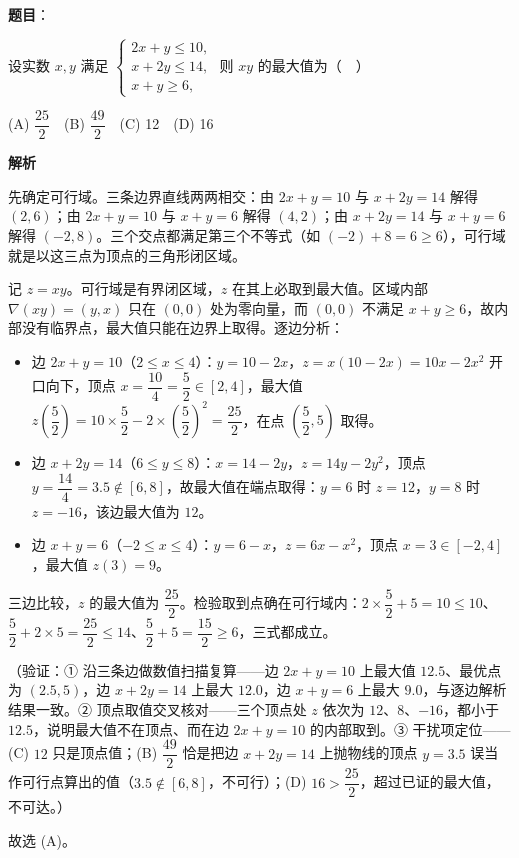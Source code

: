 \begin{answer}

\textbf{题目}：

设实数 \(x,y\) 满足 \(\begin{cases}2x+y\leqslant 10,\\ x+2y\leqslant 14,\\ x+y\geqslant 6,\end{cases}\) 则 \(xy\) 的最大值为（　）

(A) \(\dfrac{25}{2}\)　(B) \(\dfrac{49}{2}\)　(C) 12　(D) 16

\textbf{解析}

先确定可行域。三条边界直线两两相交：由 \(2x+y=10\) 与 \(x+2y=14\) 解得 \((2,6)\)；由 \(2x+y=10\) 与 \(x+y=6\) 解得 \((4,2)\)；由 \(x+2y=14\) 与 \(x+y=6\) 解得 \((-2,8)\)。三个交点都满足第三个不等式（如 \((-2)+8=6\geqslant6\)），可行域就是以这三点为顶点的三角形闭区域。

记 \(z=xy\)。可行域是有界闭区域，\(z\) 在其上必取到最大值。区域内部 \(\nabla(xy)=(y,x)\) 只在 \((0,0)\) 处为零向量，而 \((0,0)\) 不满足 \(x+y\geqslant6\)，故内部没有临界点，最大值只能在边界上取得。逐边分析：

\begin{itemize}
\item 边 \(2x+y=10\)（\(2\leqslant x\leqslant4\)）：\(y=10-2x\)，\(z=x(10-2x)=10x-2x^2\) 开口向下，顶点 \(x=\dfrac{10}{4}=\dfrac52\in[2,4]\)，最大值 \(z\left(\dfrac52\right)=10\times\dfrac52-2\times\left(\dfrac52\right)^2=\dfrac{25}{2}\)，在点 \(\left(\dfrac52,5\right)\) 取得。
\item 边 \(x+2y=14\)（\(6\leqslant y\leqslant8\)）：\(x=14-2y\)，\(z=14y-2y^2\)，顶点 \(y=\dfrac{14}{4}=3.5\notin[6,8]\)，故最大值在端点取得：\(y=6\) 时 \(z=12\)，\(y=8\) 时 \(z=-16\)，该边最大值为 \(12\)。
\item 边 \(x+y=6\)（\(-2\leqslant x\leqslant4\)）：\(y=6-x\)，\(z=6x-x^2\)，顶点 \(x=3\in[-2,4]\)，最大值 \(z(3)=9\)。
\end{itemize}

三边比较，\(z\) 的最大值为 \(\dfrac{25}{2}\)。检验取到点确在可行域内：\(2\times\dfrac52+5=10\leqslant10\)、\(\dfrac52+2\times5=\dfrac{25}{2}\leqslant14\)、\(\dfrac52+5=\dfrac{15}{2}\geqslant6\)，三式都成立。

（验证：① 沿三条边做数值扫描复算——边 \(2x+y=10\) 上最大值 \(12.5\)、最优点为 \((2.5,5)\)，边 \(x+2y=14\) 上最大 \(12.0\)，边 \(x+y=6\) 上最大 \(9.0\)，与逐边解析结果一致。② 顶点取值交叉核对——三个顶点处 \(z\) 依次为 \(12\)、\(8\)、\(-16\)，都小于 \(12.5\)，说明最大值不在顶点、而在边 \(2x+y=10\) 的内部取到。③ 干扰项定位——(C) \(12\) 只是顶点值；(B) \(\dfrac{49}{2}\) 恰是把边 \(x+2y=14\) 上抛物线的顶点 \(y=3.5\) 误当作可行点算出的值（\(3.5\notin[6,8]\)，不可行）；(D) \(16>\dfrac{25}{2}\)，超过已证的最大值，不可达。）

故选 (A)。


\end{answer}
